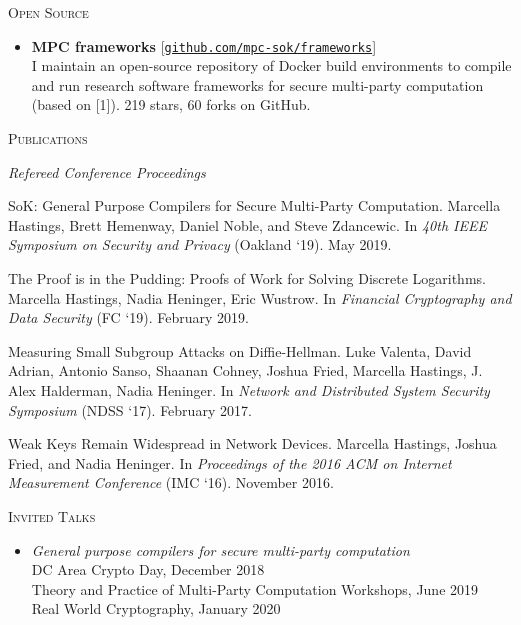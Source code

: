 \documentclass{article}
\begin{document}
\textsc{Open Source} \hrulefill
\begin{itemize}[label={}]
  \item \textbf{MPC frameworks} [\href{https://github.com/mpc-sok/frameworks}{\texttt{github.com/mpc-sok/frameworks}}]\\
  I maintain an open-source repository of Docker build environments to compile and run research software frameworks for secure multi-party computation (based on [1]). 219 stars, 60 forks on GitHub. 
\end{itemize}

\textsc{Publications} \hrulefill

\textit{Refereed Conference Proceedings}
\begin{enumerate}[label={[\arabic*]}]
\item SoK: General Purpose Compilers for Secure Multi-Party Computation. 
Marcella Hastings, Brett Hemenway, Daniel Noble, and Steve Zdancewic.
In \textit{40th IEEE Symposium on Security and Privacy} (Oakland `19). May 2019.
\item The Proof is in the Pudding: Proofs of Work for Solving Discrete Logarithms.
Marcella Hastings, Nadia Heninger, Eric Wustrow.
In \emph{Financial Cryptography and Data Security} (FC `19). February 2019.
\item Measuring Small Subgroup Attacks on Diffie-Hellman. 
Luke Valenta, David Adrian, Antonio Sanso, Shaanan Cohney, Joshua Fried, Marcella Hastings, J. Alex Halderman, Nadia Heninger. 
In \textit{Network and Distributed System Security Symposium} (NDSS `17). February 2017.
\item Weak Keys Remain Widespread in Network Devices. 
Marcella Hastings, Joshua Fried, and Nadia Heninger. 
In \textit{Proceedings of the 2016 ACM on Internet Measurement Conference} (IMC `16). November 2016.
\end{enumerate}

\textsc{Invited Talks} \hrulefill
\begin{itemize}[label={}]
\item \emph{General purpose compilers for secure multi-party computation}\\
  DC Area Crypto Day, December 2018 \\
  Theory and Practice of Multi-Party Computation Workshops, June 2019\\
  Real World Cryptography, January 2020
\end{itemize}



\end{document}
